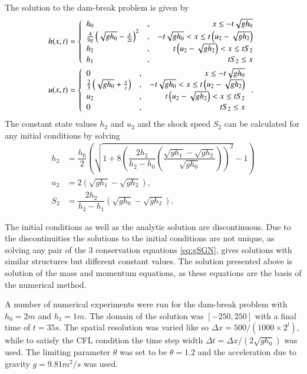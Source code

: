 \documentclass[10pt]{elsarticle}
\begin{document}
The solution to the dam-break problem is given by
\begin{align}
h(x,t) &= \left \lbrace \begin{array}{l c r}
h_0 &,& x \le -t\sqrt{g h_0} \\
\frac{4}{9g} \left(\sqrt{gh_0} - \frac{x}{2t}\right)^2 &,&  -t\sqrt{g h_0} < x \le t \left(u_2 - \sqrt{g h_2}\right)  \\
h_2 &,&  t \left(u_2 - \sqrt{g h_2}\right) < x \le t S_2  \\
h_1 &,&   t S_2 \le x \\
\end{array} \right.  \\
u(x,t) &= \left \lbrace \begin{array}{l c r}
0 &,& x \le -t\sqrt{g h_0} \\
\frac{2}{3} \left(\sqrt{gh_0} + \frac{x}{t}\right) &,&  -t\sqrt{g h_0} < x \le t \left(u_2 - \sqrt{g h_2}\right)  \\
u_2 &,&  t \left(u_2 - \sqrt{g h_2}\right) < x \le t S_2  \\
0 &,&   t S_2 \le x \\
\end{array} \right. .
\end{align}
%
The constant state values $h_2$ and $u_2$ and the shock speed $S_2$ can be calculated for any initial conditions by solving
\begin{align}
\label{eq:SWWEMiddleState}
h_2 &= \dfrac{h_0}{2} \left(  \sqrt{1 + 8 \left( \dfrac{2 h_2}{h_2 - h_0} \left(\dfrac{\sqrt{gh_1} - \sqrt{gh_2}}{\sqrt{gh_0}}\right)\right)^2 } - 1 \right) \\
u_2 &= 2\left(\sqrt{gh_1} - \sqrt{gh_2} \right),\\
S_2 &= \dfrac{2 h_2}{h_2 - h_1}\left(\sqrt{gh_0} - \sqrt{gh_2} \right).
\end{align}

The initial conditions as well as the analytic solution are discontinuous. Due to the discontinuities the solutions to the initial conditions are not unique, as solving any pair of the 3 conservation equations \eqref{eq:gSGN}, gives solutions with similar structures but different constant values. The solution presented above is solution of the mass and momentum equations, as these equations are the basis of the numerical method.

A number of numerical experiments were run for the dam-break problem with $h_0 = 2m$ and $h_1 = 1m$. The domain of the solution was $\left[-250,250\right]$ with a final time of $t=35s$.  The spatial resolution was varied like so $\Delta x = 500 / (1000 \times 2^{l})$, while to satisfy the CFL condition \cite{Lax-Richtmyer-1956-267} the time step width $\Delta t = \Delta x  / \left( 2 \sqrt{g h_0}\right)$ was used. The limiting parameter $\theta$ was set to be $\theta = 1.2$ and the acceleration due to gravity $g = 9.81 m^2/s$ was used. 
\end{document}
